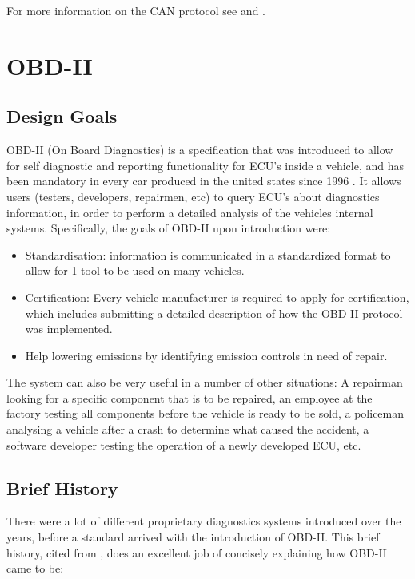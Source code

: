 For more information on the CAN protocol see \cite{ISO11898-2} and \cite{ISO11898-3}.

\section{OBD-II}
\label{sec:obd}

\subsection{Design Goals} 
\label{subsec:obd:design_goal}

OBD-II (On Board Diagnostics) is a specification that was introduced to allow for self diagnostic and reporting functionality for ECU's inside a vehicle, and has been mandatory in every car produced in the united states since 1996 \cite{wiki:OBD}. It allows users (testers, developers, repairmen, etc) to query ECU's about diagnostics information, in order to perform a detailed analysis of the vehicles internal systems. Specifically, the goals of OBD-II upon introduction were: 
\begin{itemize}
	\item Standardisation: information is communicated in a standardized format to allow for 1 tool to be used on many vehicles.
	\item Certification: Every vehicle manufacturer is required to apply for certification, which includes submitting a detailed description of how the OBD-II protocol was implemented.
	\item Help lowering emissions by identifying emission controls in need of repair.
\end{itemize} 
The system can also be very useful in a number of other situations: A repairman looking for a specific component that is to be repaired, an employee at the factory testing all components before the vehicle is ready to be sold, a policeman analysing a vehicle after a crash to determine what caused the accident, a software developer testing the operation of a newly developed ECU, etc. 

\subsection{Brief History}
\label{subsec:obd:brief_history} 

There were a lot of different proprietary diagnostics systems introduced over the years, before a standard arrived with the introduction of OBD-II. This brief history, cited from \cite{OBDhistory}, does an excellent job of concisely explaining how OBD-II came to be:

